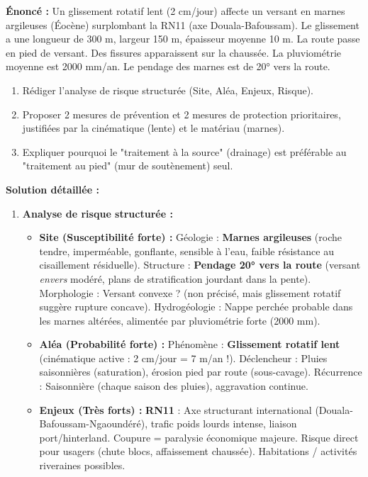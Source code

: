 \documentclass[11pt]{article}
\begin{document}
\begin{exoresolu}
    \textbf{Énoncé :} Un glissement rotatif lent (2 cm/jour) affecte un versant en marnes argileuses (Éocène) surplombant la RN11 (axe Douala-Bafoussam). Le glissement a une longueur de 300 m, largeur 150 m, épaisseur moyenne 10 m. La route passe en pied de versant. Des fissures apparaissent sur la chaussée. La pluviométrie moyenne est 2000 mm/an. Le pendage des marnes est de 20° vers la route.
    \begin{enumerate}
        \item Rédiger l'analyse de risque structurée (Site, Aléa, Enjeux, Risque).
        \item Proposer 2 mesures de prévention et 2 mesures de protection prioritaires, justifiées par la cinématique (lente) et le matériau (marnes).
        \item Expliquer pourquoi le "traitement à la source" (drainage) est préférable au "traitement au pied" (mur de soutènement) seul.
    \end{enumerate}
    \tcblower
    \textbf{Solution détaillée :}
    \begin{enumerate}
        \item \textbf{Analyse de risque structurée :}
            \begin{itemize}
                \item \textbf{Site (Susceptibilité forte) :} Géologie : \textbf{Marnes argileuses} (roche tendre, imperméable, gonflante, sensible à l'eau, faible résistance au cisaillement résiduelle). Structure : \textbf{Pendage 20° vers la route} (versant \emph{envers} modéré, plans de stratification jourdant dans la pente). Morphologie : Versant convexe ? (non précisé, mais glissement rotatif suggère rupture concave). Hydrogéologie : Nappe perchée probable dans les marnes altérées, alimentée par pluviométrie forte (2000 mm).
                \item \textbf{Aléa (Probabilité forte) :} Phénomène : \textbf{Glissement rotatif lent} (cinématique active : 2 cm/jour = 7 m/an !). Déclencheur : Pluies saisonnières (saturation), érosion pied par route (sous-cavage). Récurrence : Saisonnière (chaque saison des pluies), aggravation continue.
                \item \textbf{Enjeux (Très forts) :} \textbf{RN11} : Axe structurant international (Douala-Bafoussam-Ngaoundéré), trafic poids lourds intense, liaison port/hinterland. Coupure = paralysie économique majeure. Risque direct pour usagers (chute blocs, affaissement chaussée). Habitations / activités riveraines possibles.

\end{itemize}
\end{enumerate}
\end{exoresolu}
\end{document}
